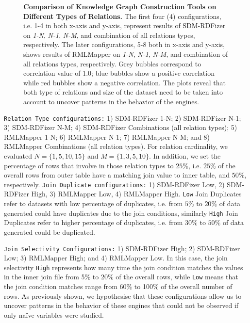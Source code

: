 \begin{figure}[!t]
{      \label{fig:rt_all}
    }
    \caption[Knowledge Graph Construction Tools on Different Types of Relations]{\textbf{Comparison of Knowledge Graph Construction Tools on Different Types of Relations.} The first four (4) configurations, i.e. 1-4 in both x-axis and y-axis, represent results of SDM-RDFizer on \textit{1-N}, \textit{N-1}, \textit{N-M}, and combination of all relations types, respectively. The later configurations, 5-8 both in x-axis and y-axis, shows results of RMLMapper on \textit{1-N}, \textit{N-1}, \textit{N-M}, and combination of all relations types, respectively. Grey bubbles correspond to correlation value of $1.0$; blue bubbles show a positive correlation while red bubbles show a negative correlation. The plots reveal that both type of relations and size of the dataset need to be taken into account to uncover patterns in the behavior of the engines. 
    }
    \label{fig:relation_type_bubble}
\end{figure}
\texttt{Relation Type configurations:} 1) SDM-RDFizer 1-N; 2) SDM-RDFizer N-1; 3) SDM-RDFizer N-M; 4) SDM-RDFizer Combinations (all relation types); 5) RMLMapper 1-N; 6) RMLMapper N-1; 7) RMLMapper N-M; and 8) RMLMapper Combinations (all relation types). For relation cardinality, we evaluated $N=\{1, 5, 10, 15\}$ and $M=\{1, 3, 5, 10\}$. In addition, we set the percentage of rows that involve in those relation types to $25\%$, i.e. $25\%$ of the overall rows from outer table have a matching join value to inner table, and $50\%$, respectively.
%
\texttt{Join Duplicate configurations:}  1) SDM-RDFizer Low, 2) SDM-RDFizer High, 3) RMLMapper Low, 4) RMLMapper High. \texttt{Low} Join Duplicates refer to datasets with low percentage of duplicates, i.e. from $5\%$ to $20\%$ of data generated could have duplicates due to the join conditions, similarly 
\texttt{High} Join Duplicates refer to higher percentage of duplicates, i.e. from $30\%$ to $50\%$ of data generated could be duplicated. 
%

\texttt{Join Selectivity Configurations:} 1) SDM-RDFizer High; 2) SDM-RDFizer Low; 3) RMLMapper High; and 4) RMLMapper Low. In this case, the join selectivity \texttt{High} represents how many time the join condition matches the values in the inner join file from 5\% to 20\% of the overall rows, while \texttt{Low} means that the join condition matches range from 60\% to 100\% of the overall number of rows. As previously shown, we hypothesise that these configurations allow us to uncover patterns in the behavior of these engines that could not be observed if only na{\"i}ve variables were studied. 

